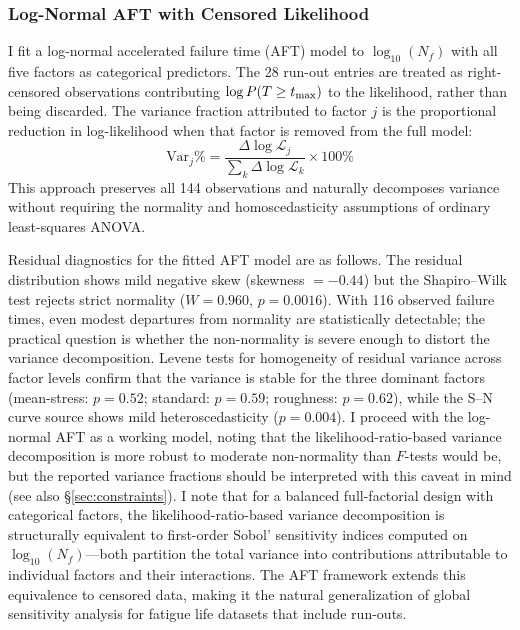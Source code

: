 \documentclass[12pt,a4paper]{article}
\begin{document}
\subsubsection{Log-Normal AFT with Censored Likelihood}

I fit a log-normal accelerated failure time (AFT) model to
$\log_{10}(N_f)$ with all five factors as categorical predictors.
The 28 run-out entries are treated as right-censored observations
contributing $\log P(T \geq t_{\rm max})$ to the likelihood, rather
than being discarded. The variance fraction attributed to factor
$j$ is the proportional reduction in log-likelihood when that factor
is removed from the full model:
\begin{equation}
\text{Var}_j\% =
\frac{\Delta\log\mathcal{L}_j}{\sum_k \Delta\log\mathcal{L}_k}
\times 100\%
\label{eq:lr_var}
\end{equation}
This approach
preserves all 144 observations and naturally decomposes variance
without requiring the normality and homoscedasticity assumptions of
ordinary least-squares ANOVA.

Residual diagnostics for the fitted AFT model are as follows.
The residual distribution shows mild negative skew (skewness
$=-0.44$) but the Shapiro--Wilk test rejects strict normality
($W=0.960$, $p=0.0016$). With 116 observed failure times, even
modest departures from normality are statistically detectable;
the practical question is whether the non-normality is severe
enough to distort the variance decomposition. Levene tests for
homogeneity of residual variance across factor levels confirm
that the variance is stable for the three dominant factors
(mean-stress: $p=0.52$; standard: $p=0.59$; roughness:
$p=0.62$), while the S--N curve source shows mild
heteroscedasticity ($p=0.004$). I proceed with the log-normal
AFT as a working model, noting that the likelihood-ratio-based
variance decomposition is more robust to moderate non-normality
than $F$-tests would be, but the reported variance fractions
should be interpreted with this caveat in mind (see also
\S\ref{sec:constraints}). I note that for a balanced full-factorial
design with categorical factors, the likelihood-ratio-based variance
decomposition is structurally equivalent to first-order Sobol'
sensitivity indices computed on $\log_{10}(N_f)$---both partition the
total variance into contributions attributable to individual factors
and their interactions. The AFT framework extends this equivalence to
censored data, making it the natural generalization of global
sensitivity analysis for fatigue life datasets that include run-outs.
\end{document}
